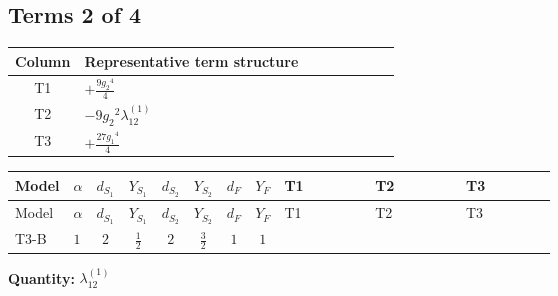 \documentclass[8pt]{article}
\begin{document}
\begin{landscape}
\subsection*{Terms 2 of 4}
\begin{center}
\begin{tabular}{@{}c >{\raggedright\arraybackslash}p{0.82\linewidth}@{}}
\toprule
Column & Representative term structure \\
\midrule
T1 & \(\displaystyle +\frac{9 {g_2}^4}{4}\) \\
\midrule
T2 & \(\displaystyle -9 {g_2}^2 {\lambda_{12}^{(1)}}\) \\
\midrule
T3 & \(\displaystyle +\frac{27 {g_1}^4}{4}\) \\
\midrule
\bottomrule
\end{tabular}
\end{center}
\smallskip
\tiny
\begin{longtable}{@{}llcccccc >{\raggedright\arraybackslash}p{0.21\linewidth} >{\raggedright\arraybackslash}p{0.21\linewidth} >{\raggedright\arraybackslash}p{0.21\linewidth}@{}}
\toprule
Model & $\alpha$ & $d_{S_1}$ & $Y_{S_1}$ & $d_{S_2}$ & $Y_{S_2}$ & $d_F$ & $Y_F$ & T1 & T2 & T3 \\
\midrule
\endfirsthead
\toprule
Model & $\alpha$ & $d_{S_1}$ & $Y_{S_1}$ & $d_{S_2}$ & $Y_{S_2}$ & $d_F$ & $Y_F$ & T1 & T2 & T3 \\
\midrule
\endhead
T3-B & $1$ & $2$ & $\frac{1}{2}$ & $2$ & $\frac{3}{2}$ & $1$ & $1$ & \scriptsize\adjustbox{max width=\linewidth}{$\begin{gathered} +\frac{9 {g_2}^4}{4}\end{gathered}$} & \scriptsize\adjustbox{max width=\linewidth}{$\begin{gathered} -9 {g_2}^2 {\lambda_{12}^{(1)}}\end{gathered}$} & \scriptsize\adjustbox{max width=\linewidth}{$\begin{gathered} +\frac{27 {g_1}^4}{4}\end{gathered}$} \\
\midrule
\bottomrule
\end{longtable}
\clearpage
\noindent\textbf{Quantity: }$\lambda_{12}^{(1)}$\par\smallskip

\end{landscape}
\end{document}
